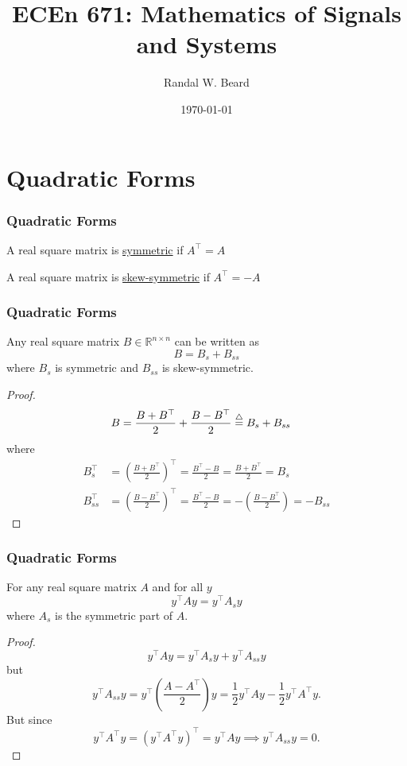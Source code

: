 \documentclass{beamer}
\title{ECEn 671: Mathematics of Signals and Systems}
\author{Randal W. Beard}
\institute{Brigham Young University}
\date{\today}
\begin{document}
\begin{frame}
	\titlepage
\end{frame}



\section{Quadratic Forms}
\frame{\sectionpage}

\begin{frame}\frametitle{Quadratic Forms}
	\begin{definition}
		A real square matrix is \underline{symmetric} if $A^\top =A$	
	\end{definition}
	
	\begin{definition}
		A real square matrix is \underline{skew-symmetric} if $A^\top  = -A$
	\end{definition}
\end{frame}

\begin{frame}\frametitle{Quadratic Forms}
	\begin{lemma}
		Any real square matrix $B\in\mathbb{R}^{n\times n}$ can be written as
		\[ 
			B = B_s + B_{ss} 
		\]
		where $B_s$ is symmetric and $B_{ss}$ is skew-symmetric.
	\end{lemma}
	
	\begin{proof}
		\begin{align*}
			B &= \frac{B + B^\top }{2} + \frac{B - B^\top }{2} 
			  \stackrel{\triangle}{=}  B_s + B_{ss} 
		\end{align*}
		where
		\begin{align*}
			B_s^\top  &= \left(\frac{B + B^\top }{2}\right)^\top  
			      = \frac{B^\top  - B}{2} = \frac{B + B^\top }{2} 
			      = B_s \\
			B_{ss}^\top  &= \left(\frac{B-B^\top }{2}\right)^\top  
			         = \frac{B^\top -B}{2} 
			          = -\left(\frac{B-B^\top }{2}\right) 
			         = -B_{ss} 
		\end{align*}
	\end{proof}
\end{frame}

\begin{frame}\frametitle{Quadratic Forms}
	\begin{lemma}
		For any real square matrix $A$ and for all $y$
		\[ 
			y^\top Ay = y^\top A_sy 
		\]
		where $A_s$ is the symmetric part of $A$.
	\end{lemma}
	
	\begin{proof}
	\[ 
		y^\top Ay = y^\top A_sy + y^\top A_{ss}y 
	\]
	but
	\[
		y^\top A_{ss}y = y^\top \left(\frac{A-A^\top }{2}\right)y 
		           = \frac{1}{2}y^\top Ay - \frac{1}{2}y^\top A^\top y.
	\]
	But since
	\[
		y^\top A^\top y = (y^\top A^\top y)^\top  
		        = y^\top Ay 
		        \implies y^\top A_{ss}y = 0.
	\]		
	\end{proof}
\end{frame}
\end{document}
